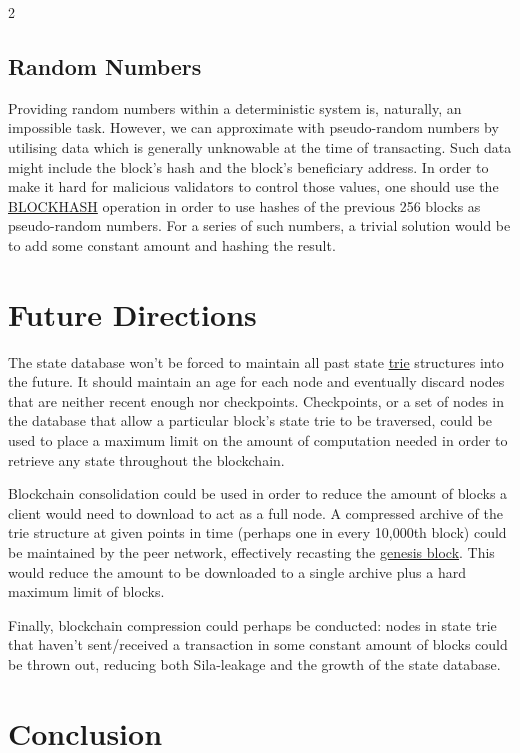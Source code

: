 \documentclass[9pt,oneside]{amsart}
\begin{document}
\begin{multicols}{2}
\subsection{Random Numbers}
Providing random numbers within a deterministic system is, naturally, an impossible task. However, we can approximate with pseudo-random numbers by utilising data which is generally unknowable at the time of transacting. Such data might include the block's hash and the block's beneficiary address. In order to make it hard for malicious validators to control those values, one should use the {\small \hyperlink{blockhash}{BLOCKHASH}} operation in order to use hashes of the previous 256 blocks as pseudo-random numbers. For a series of such numbers, a trivial solution would be to add some constant amount and hashing the result.

\section{Future Directions} \label{ch:future}

The state database won't be forced to maintain all past state \hyperlink{trie}{trie} structures into the future. It should maintain an age for each node and eventually discard nodes that are neither recent enough nor checkpoints. Checkpoints, or a set of nodes in the database that allow a particular block's state trie to be traversed, could be used to place a maximum limit on the amount of computation needed in order to retrieve any state throughout the blockchain.

Blockchain consolidation could be used in order to reduce the amount of blocks a client would need to download to act as a full node. A compressed archive of the trie structure at given points in time (perhaps one in every 10,000th block) could be maintained by the peer network, effectively recasting the \hyperlink{Genesis_Block}{genesis block}. This would reduce the amount to be downloaded to a single archive plus a hard maximum limit  of blocks.

Finally, blockchain compression could perhaps be conducted: nodes in state trie that haven't sent/received a transaction in some constant amount of blocks could be thrown out, reducing both Sila-leakage and the growth of the state database.

\section{Conclusion} \label{ch:conclusion}


\end{multicols}
\end{document}
